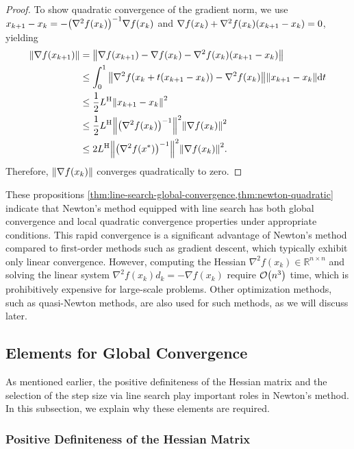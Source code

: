 \documentclass[0_en]{subfiles}
\begin{document}
\begin{proof}
    To show quadratic convergence of the gradient norm, we use $x_{k+1}-x_k=-\qty(\nabla^2 f(x_k))^{-1}\nabla f(x_k)$ and
    $\nabla f(x_k)+\nabla^2 f(x_k)\qty(x_{k+1}-x_k)=0$, yielding
    \begin{align*}
        \norm{\nabla f(x_{k+1})}
         & = \norm{\nabla f(x_{k+1})-\nabla f(x_k)-\nabla^2 f(x_k)\qty(x_{k+1}-x_k)}                  \\
         & \le \int_0^1 \norm{\nabla^2 f(x_k+t (x_{k+1}-x_k))-\nabla^2 f(x_k)}\norm{x_{k+1}-x_k}\dd t \\
         & \le \frac{1}{2}L^{\mathrm{H}}\norm{x_{k+1}-x_k}^2                                          \\
         & \le \frac{1}{2}L^{\mathrm{H}}\norm{\qty(\nabla^2 f(x_k))^{-1}}^2\norm{\nabla f(x_k)}^2     \\
         & \le 2 L^{\mathrm{H}} \norm{\qty(\nabla^2 f(x^*))^{-1}}^2\norm{\nabla f(x_k)}^2.
    \end{align*}
    Therefore, $\norm{\nabla f(x_k)}$ converges quadratically to zero.
\end{proof}

These propositions \cref{thm:line-search-global-convergence,thm:newton-quadratic} indicate that Newton's method equipped with line search has both global convergence and local quadratic convergence properties under appropriate conditions.
This rapid convergence is a significant advantage of Newton's method compared to first-order methods such as gradient descent, which typically exhibit only linear convergence.
However, computing the Hessian $\nabla^2 f(x_k) \in \mathbb{R}^{n \times n}$ and solving the linear system $\nabla^2 f(x_k) d_k = -\nabla f(x_k)$ require $\order{n^3}$ time, which is prohibitively expensive for large-scale problems.
Other optimization methods, such as quasi-Newton methods, are also used for such methods, as we will discuss later.

\subsection{Elements for Global Convergence}

As mentioned earlier, the positive definiteness of the Hessian matrix and the selection of the step size via line search play important roles in Newton's method.
In this subsection, we explain why these elements are required.

\subsubsection{Positive Definiteness of the Hessian Matrix}
\end{document}
